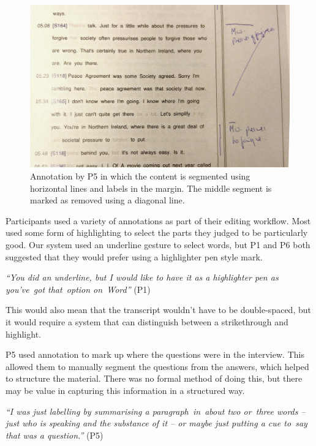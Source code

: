 \begin{figure}[h]
  \centering
  \includegraphics[width=\columnwidth]{figs/pen-annotations-p5-cropped.jpg}
  \caption{Annotation by P5 in which the content is segmented using horizontal lines and labels in the margin. The
  middle segment is marked as removed using a diagonal line.}
  \label{fig:p5-annotations}
\end{figure}


Participants used a variety of annotations as part of their editing workflow. Most used some form of highlighting to
select the parts they judged to be particularly good. Our system used an underline gesture to select words, but P1 and
P6 both suggested that they would prefer using a highlighter pen style mark.

\textit{``You did an underline, but I would like to have it as a highlighter pen as you've got that option on Word''}
(P1)

This would also mean that the transcript wouldn't have to be double-spaced, but it would require a system that can
distinguish between a strikethrough and highlight.


P5 used annotation to mark up where the questions were in the interview. This allowed them to manually segment the
questions from the answers, which helped to structure the material. There was no formal method of doing this, but there
may be value in capturing this information in a structured way.

\textit{``I was just labelling by summarising a paragraph in about two or three words -- just who is speaking and the
substance of it -- or maybe just putting a cue to say that was a question.''} (P5) 

